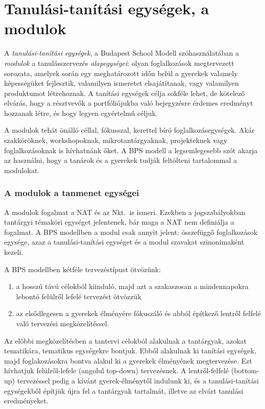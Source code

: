 \hypertarget{tanulasi-tanitasi-egysegek-a-modulok}{%
\section{Tanulási-tanítási egységek, a
modulok}\label{tanulasi-tanitasi-egysegek-a-modulok}}

A \emph{tanulási-tanítási egységek}, a Budapest School Modell
szóhasználatában a \emph{modulok} a tanulásszervezés
\emph{alapegységei}: olyan foglalkozások megtervezett sorozata, amelyek
során egy meghatározott időn belül a gyerekek valamely képességüket
fejlesztik, valamilyen ismeretet elsajátítanak, vagy valamilyen
produktumot létrehoznak. A tanítási egységek célja sokféle lehet, de
kötelező elvárás, hogy a résztvevők a portfóliójukba való bejegyzésre érdemes
eredményt hozzanak létre, és hogy legyen egyértelmű céljuk.

A modulok tehát önálló céllal, fókusszal, kerettel bíró
foglalkozásegységek. Akár szakköröknek, workshopoknak,
mikrotantárgyaknak, projekteknek vagy foglalkozásoknak is hívhatnánk őket. A BPS modell a
legsemlegesebb szót akarja az használni, hogy a tanárok és a gyerekek
tudják feltölteni tartalommal a modulokat.

\hypertarget{a-modulok-a-tanmenet-egysegei}{%
\subsubsection{A modulok a tanmenet
egységei}\label{a-modulok-a-tanmenet-egysegei}}

A modulok fogalmat a NAT és az Nkt.\ is ismeri. Ezekben a jogszabályokban
tantárgyi témaköri egységet jelentenek, bár maga a NAT nem definiálja a
fogalmat. A BPS modellben a modul csak annyit jelent: összefüggő
foglalkozások egysége, azaz a tanulási-tanítási egységet és a modul
szavakat szinonimaként kezeli. 

A BPS modellben kétféle tervezéstípust ötvözünk:

\begin{enumerate}
\def\labelenumi{\arabic{enumi}.}
\tightlist
\item
  a hosszú távú célokból kiinduló, majd azt a szakaszosan a mindennapokra
  lebontó felülről lefelé tervezést ötvözzük
\item
  az elsődlegesen a gyerekek élményére fókuszáló és abból építkező
  lentről felfelé való tervezési megközelítéssel.
\end{enumerate}

Az előbbi megközelítésben a tantervi célokból alakulnak a tantárgyak,
azokat tematikára, tematikus egységekre bontjuk. Ebből alakulnak ki
tanítási egységek, majd foglakozásokra bontva alakul ki a gyerekek
élményének megtervezése. Ezt hívhatjuk felülről-lefele (angolul
top-down) tervezésnek. A lentről-felfelé (bottom-up) tervezéssel pedig
a kívánt gyerek-élménytől indulunk ki, és a tanulási-tanítási
egységekből építjük újra fel a tantárgyak tartalmát, illetve az elvárt
tanulási eredményeket.

